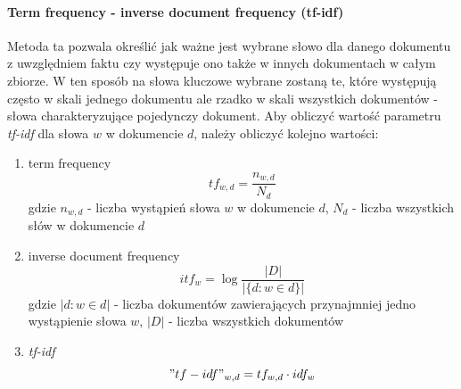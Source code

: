 \documentclass{classrep}
\begin{document}
{{{                \paragraph{Term frequency - inverse document frequency (tf-idf)} {
                    Metoda ta pozwala określić jak ważne jest wybrane słowo dla danego dokumentu z uwzględniem faktu
                    czy występuje ono także w innych dokumentach w całym zbiorze. W ten sposób na słowa kluczowe wybrane zostaną
                    te, które występują często w skali jednego dokumentu ale rzadko w skali wszystkich dokumentów - słowa
                    charakteryzujące pojedynczy dokument. Aby obliczyć wartość parametru \emph{tf-idf} dla słowa $w$ w dokumencie
                    $d$, należy obliczyć kolejno wartości:
                    \begin{enumerate}
                        \item term frequency
                        \begin{equation}
                            tf_{w,d} = \frac{n_{w,d}}{N_{d}}
                        \end{equation}
                        gdzie $n_{w,d}$ - liczba wystąpień słowa $w$ w dokumencie $d$, $N_d$ - liczba wszystkich słów w dokumencie $d$
                        \item inverse document frequency
                        \begin{equation}
                            itf_{w} = \log\frac{|D|}{|\{d: w \in d\}|}
                        \end{equation}
                        gdzie $|{d: w \in d}|$ - liczba dokumentów zawierających przynajmniej jedno wystąpienie słowa $w$,
                        $|D|$ - liczba wszystkich dokumentów
                        \item \emph{tf-idf}
                        \begin{equation}
                            "tf-idf"_{w,d} = tf_{w,d} \cdot idf_{w}
                        \end{equation}
                    \end{enumerate}
                }


}}}
\end{document}
